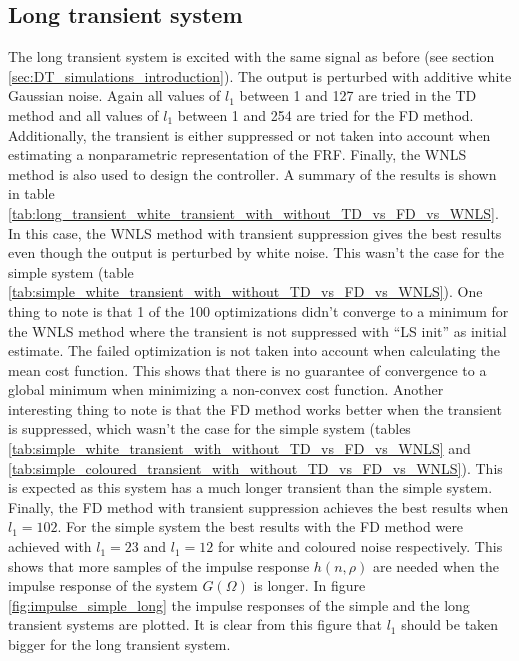 \subsection{Long transient system}
The long transient system is excited with the same signal as before (see section \ref{sec:DT_simulations_introduction}). The output is perturbed with additive white Gaussian noise. Again all values of $l_1$ between 1 and 127 are tried in the TD method and all values of $l_1$ between 1 and 254 are tried for the FD method. Additionally, the transient is either suppressed or not taken into account when estimating a nonparametric representation of the FRF. Finally, the WNLS method is also used to design the controller. A summary of the results is shown in table \ref{tab:long_transient_white_transient_with_without_TD_vs_FD_vs_WNLS}. In this case, the WNLS method with transient suppression gives the best results even though the output is perturbed by white noise. This wasn't the case for the simple system (table \ref{tab:simple_white_transient_with_without_TD_vs_FD_vs_WNLS}). 
One thing to note is that 1 of the 100 optimizations didn't converge to a minimum for the WNLS method where the transient is not suppressed with ``LS init'' as initial estimate. The failed optimization is not taken into account when calculating the mean cost function.
This shows that there is no guarantee of convergence to a global minimum when minimizing a non-convex cost function. Another interesting thing to note is that the FD method works better when the transient is suppressed, which wasn't the case for the simple system (tables \ref{tab:simple_white_transient_with_without_TD_vs_FD_vs_WNLS} and \ref{tab:simple_coloured_transient_with_without_TD_vs_FD_vs_WNLS}). This is expected as this system has a much longer transient than the simple system. Finally, the FD method with transient suppression achieves the best results when $l_1 = 102$. For the simple system the best results with the FD method were achieved with $l_1 = 23$ and $l_1 = 12$ for white and coloured noise respectively. This shows that more samples of the impulse response $h(n,\rho)$ are needed when the impulse response of the system $G(\Omega)$ is longer. In figure \ref{fig:impulse_simple_long} the impulse responses of the simple and the long transient systems are plotted. It is clear from this figure that $l_1$ should be taken bigger for the long transient system. 

